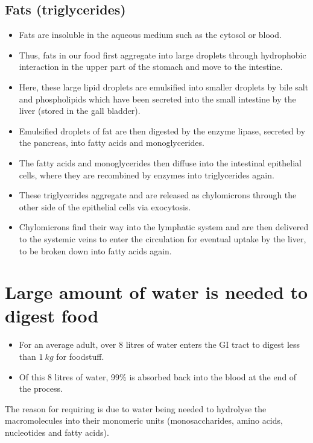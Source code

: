 \documentclass[11pt]{article}
\begin{document}
\newpage
\subsection{Fats (triglycerides)}
\label{sec:org83e954c}
\begin{itemize}
\item Fats are insoluble in the aqueous medium such as the cytosol or blood.
\item Thus, fats in our food first aggregate into large droplets through hydrophobic interaction in the upper part of the stomach and move to the intestine.
\item Here, these large lipid droplets are emulsified into smaller droplets by bile salt and phospholipids which have been secreted into the small intestine by the liver (stored in the gall bladder).
\item Emulsified droplets of fat are then digested by the enzyme lipase, secreted by the pancreas, into fatty acids and monoglycerides.
\item The fatty acids and monoglycerides then diffuse into the intestinal epithelial cells, where they are recombined by enzymes into triglycerides again.
\item These triglycerides aggregate and are released as chylomicrons through the other side of the epithelial cells via exocytosis.
\item Chylomicrons find their way into the lymphatic system and are then delivered to the systemic veins to enter the circulation for eventual uptake by the liver, to be broken down into fatty acids again.
\end{itemize}

\newpage
\section{Large amount of water is needed to digest food}
\label{sec:orgc2441c4}
\begin{itemize}
\item For an average adult, over 8 litres of water enters the GI tract to digest less than \(\qty{1}{\unit{kg}}\) for foodstuff.
\item Of this 8 litres of water, 99\% is absorbed back into the blood at the end of the process.
\end{itemize}

The reason for requiring is due to water being needed to hydrolyse the macromolecules into their monomeric units (monosaccharides, amino acids, nucleotides and fatty acids).
\end{document}
